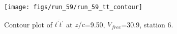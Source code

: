 \begin{figure}[H]
\centering
\texttt{[image: figs/run\_59/run\_59\_tt\_contour]}
\caption{Contour plot of $\overline{t^\prime t^\prime}$ at $z/c$=9.50, $V_{free}$=30.9, station 6.}
\end{figure}


